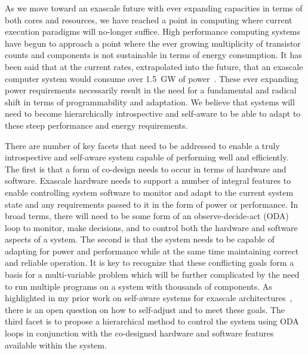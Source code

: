 \label{chap:introduction}





As we move toward an exascale future with ever expanding capacities in terms of both cores and resources, we have reached a point in computing where current execution paradigms will no-longer suffice. High performance computing systems have begun to approach a point where the ever growing multiplicity of transistor counts and components is not sustainable in terms of energy consumption. It has been said that at the current rates, extrapolated into the future, that an exascale computer system would consume over 1.5~GW of power~\cite{Green500Year3}. These ever expanding power requirements necessarily result in the need for a fundamental and radical shift in terms of programmability and adaptation. We believe that systems will need to become hierarchically introspective and self-aware to be able to adapt to these steep performance and energy requirements.

There are number of key facets that need to be addressed to enable a truly introspective and self-aware system capable of performing well and efficiently. The first is that a form of co-design needs to occur in terms of hardware and software. Exascale hardware needs to support a number of integral features to enable controlling system software to monitor and adapt to the current system state and any requirements passed to it in the form of power or performance. In broad terms, there will need to be some form of an observe-decide-act (ODA) loop to monitor, make decisions, and to control both the hardware and software aspects of a system. The second is that the system needs to be capable of adapting for power and performance while at the same time maintaining correct and reliable operation. It is key to recognize that these conflicting goals form a basis for a multi-variable problem which will be further complicated by the need to run multiple programs on a system with thousands of components. As highlighted in my prior work on self-aware systems for exascale architectures~\cite{Landwehr2014}, there is an open question on how to self-adjust and to meet these goals. The third facet is to propose a hierarchical method to control the system using ODA loops in conjunction with the co-designed hardware and software features available within the system.


